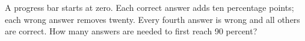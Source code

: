 A progress bar starts at zero. Each correct answer adds ten percentage points; each wrong answer removes twenty. Every fourth answer is wrong and all others are correct. How many answers are needed to first reach 90 percent?
